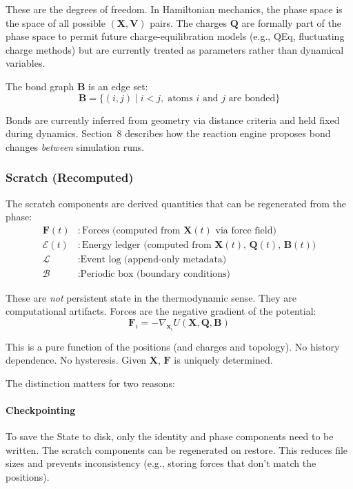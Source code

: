 \documentclass[11pt]{article}
\begin{document}
These are the degrees of freedom. In Hamiltonian mechanics, the phase space is the space of all possible $(\mathbf{X}, \mathbf{V})$ pairs. The charges $\mathbf{Q}$ are formally part of the phase space to permit future charge-equilibration models (e.g., QEq, fluctuating charge methods) but are currently treated as parameters rather than dynamical variables.

The bond graph $\mathbf{B}$ is an edge set:
\begin{equation}
\mathbf{B} = \{(i, j) \mid i < j, \; \text{atoms } i \text{ and } j \text{ are bonded}\}
\end{equation}

Bonds are currently inferred from geometry via distance criteria and held fixed during dynamics. Section~8 describes how the reaction engine proposes bond changes \textit{between} simulation runs.

\subsubsection{Scratch (Recomputed)}

The scratch components are derived quantities that can be regenerated from the phase:
\begin{align}
\mathbf{F}(t) &: \text{Forces (computed from } \mathbf{X}(t) \text{ via force field)} \\
\mathcal{E}(t) &: \text{Energy ledger (computed from } \mathbf{X}(t) \text{, } \mathbf{Q}(t) \text{, } \mathbf{B}(t) \text{)} \\
\mathcal{L} &: \text{Event log (append-only metadata)} \\
\mathcal{B} &: \text{Periodic box (boundary conditions)}
\end{align}

These are \textit{not} persistent state in the thermodynamic sense. They are computational artifacts. Forces are the negative gradient of the potential:
\begin{equation}
\mathbf{F}_i = -\nabla_{\mathbf{x}_i} U(\mathbf{X}, \mathbf{Q}, \mathbf{B})
\end{equation}

This is a pure function of the positions (and charges and topology). No history dependence. No hysteresis. Given $\mathbf{X}$, $\mathbf{F}$ is uniquely determined.

The distinction matters for two reasons:

\paragraph{Checkpointing} To save the State to disk, only the identity and phase components need to be written. The scratch components can be regenerated on restore. This reduces file sizes and prevents inconsistency (e.g., storing forces that don't match the positions).
\end{document}
